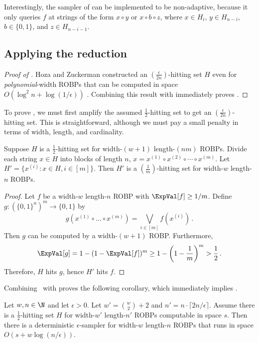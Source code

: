Interestingly, the sampler of  can be implemented to be non-adaptive, because it only queries $f$ at strings of the form $x \circ y$ or $x \circ b \circ z$, where $x \in H_i$, $y \in H_{n - i}$, $b \in \{0, 1\}$, and $z \in H_{n - i - 1}$.

\subsection{Applying the reduction}

\begin{proof}[Proof of ]
Hoza and Zuckerman constructed an $\left(\frac{\epsilon}{2n}\right)$-hitting set $H$ even for \emph{polynomial}-width ROBPs that can be computed in space $O(\log^2 n + \log(1/\epsilon))$ \cite{HZ20}. Combining this result with  immediately proves .
\end{proof}

To prove , we must first amplify the assumed $\frac{1}{2}$-hitting set to get an $\left(\frac{\epsilon}{2n}\right)$-hitting set. This is straightforward, although we must pay a small penalty in terms of width, length, and cardinality.
\begin{lemma} \label{lem:hitting-set-amplification}
Suppose $H$ is a $\frac{1}{2}$-hitting set for width-$(w + 1)$ length-$(nm)$ ROBPs. Divide each string $x \in H$ into blocks of length $n$, $x = x^{(1)} \circ x^{(2)} \circ \cdots \circ x^{(m)}$. Let $H' = \{x^{(i)} : x \in H, i \in [m]\}$. Then $H'$ is a $(\frac{1}{m})$-hitting set for width-$w$ length-$n$ ROBPs.
\end{lemma}

\begin{proof}
Let $f$ be a width-$w$ length-$n$ ROBP with $\ExpVal[f] \geq 1/m$. Define $g \colon (\{0, 1\}^n)^m \to \{0, 1\}$ by
$$
g(x^{(1)} \circ \dots \circ x^{(m)}) = \bigvee_{i \in [m]} f(x^{(i)})\,.
$$
Then $g$ can be computed by a width-$(w + 1)$ ROBP. Furthermore,
$$
\ExpVal[g] = 1 - (1 - \ExpVal[f])^m \geq 1 - \left(1 - \frac{1}{m}\right)^m > \frac{1}{2}\,.
$$
Therefore, $H$ hits $g$, hence $H'$ hits $f$.
\end{proof}

Combining~ with  proves the following corollary, which immediately implies .

\begin{corollary} \label{cor:const-width-main-generalization}
Let $w, n \in \N$ and let $\epsilon > 0$. Let $w' = \binom{w}{2} + 2$ and $n' = n \cdot \lceil 2n / \epsilon \rceil$. Assume there is a $\frac{1}{2}$-hitting set $H$ for width-$w'$ length-$n'$ ROBPs computable in space $s$. Then there is a deterministic $\epsilon$-sampler for width-$w$ length-$n$ ROBPs that runs in space $O(s + w \log(n/\epsilon))$.
\end{corollary}
